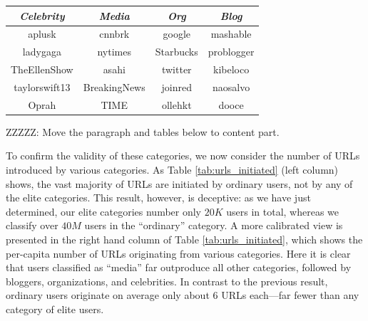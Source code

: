 \documentclass[phd,tocprelim]{cornell}
\renewcommand{\caption}[1]{\singlespacing\hangcaption{#1}\normalspacing}
\begin{document}
\begin{table}
\centering
\begin{scriptsize}
\caption{Top 5 users in each category}
\vspace{2pt}
\begin{tabular}{|c|c|c|c|} 
\hline 
\textit{Celebrity} & \textit{Media} & \textit{Org} & \textit{Blog} \\ 
\hline
aplusk & cnnbrk & google & mashable \\
ladygaga & nytimes & Starbucks & problogger \\
TheEllenShow & asahi & twitter & kibeloco \\
taylorswift13 & BreakingNews & joinred & naosalvo \\
Oprah & TIME & ollehkt & dooce \\
\hline 
\end{tabular}
\label{tab:top_k_examples}
\end{scriptsize}
\end{table}


ZZZZZ: Move the paragraph and tables below to content part.

To confirm the validity of these categories, we now consider the number of
URLs introduced by various categories. As Table \ref{tab:urls_initiated}
(left column) shows, the vast majority of URLs are initiated by ordinary
users, not by any of the elite categories.  This result, however, is
deceptive: as we have just determined, our elite categories number only
$20K$ users in total, whereas we classify over $40M$ users in the
``ordinary'' category.  A more calibrated view is presented in the right
hand column of Table \ref{tab:urls_initiated}, which shows the per-capita
number of URLs originating from various categories.  Here it is clear that
users classified as ``media'' far outproduce all other categories, followed
by bloggers, organizations, and celebrities. In contrast to the previous
result, ordinary users originate on average only about $6$ URLs
each---far fewer than any category of elite users.
\end{document}
